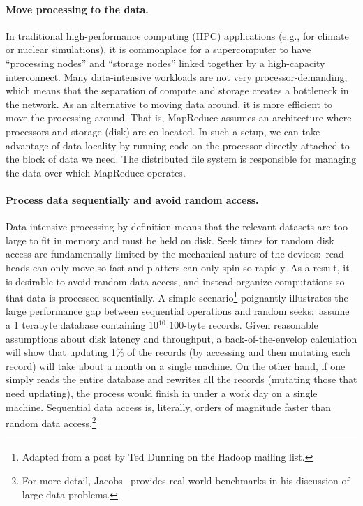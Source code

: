 
\paragraph{Move processing to the data.}
In traditional high-performance computing (HPC) applications (e.g.,
for climate or nuclear simulations), it is commonplace for a
supercomputer to have ``processing nodes'' and ``storage nodes''
linked together by a high-capacity interconnect.  Many data-intensive
workloads are not very processor-demanding, which means that the
separation of compute and storage creates a bottleneck in the network.
As an alternative to moving data around, it is more efficient to move
the processing around.  That is, MapReduce assumes an architecture
where processors and storage (disk) are co-located.  In such a setup,
we can take advantage of data locality by running code on the
processor directly attached to the block of data we need.  The
distributed file system is responsible for managing the data over
which MapReduce operates.

\paragraph{Process data sequentially and avoid random access.}
Data-intensive processing by definition means that the relevant
datasets are too large to fit in memory and must be held on disk.
Seek times for random disk access are fundamentally limited by the
mechanical nature of the devices:\ read heads can only move so fast
and platters can only spin so rapidly.  As a result, it is desirable
to avoid random data access, and instead organize computations so that
data is processed sequentially.  A simple scenario\footnote{Adapted
  from a post by Ted Dunning on the Hadoop mailing list.} poignantly
illustrates the large performance gap between sequential operations
and random seeks:\ assume a 1 terabyte database containing 10$^{10}$
100-byte records.  Given reasonable assumptions about disk latency and
throughput, a back-of-the-envelop calculation will show that updating
1$\%$ of the records (by accessing and then mutating each record) will
take about a month on a single machine.  On the other hand, if one
simply reads the entire database and rewrites all the records
(mutating those that need updating), the process would finish in under
a work day on a single machine.  Sequential data access is, literally,
orders of magnitude faster than random data access.\footnote{For more
  detail, Jacobs~\cite{JacobsAdam_2009} provides real-world benchmarks
  in his discussion of large-data problems.}

